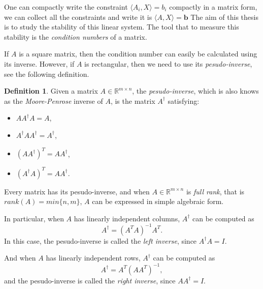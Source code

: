 \documentclass[12pt]{amsart}
\numberwithin{equation}{section}
\theoremstyle{definition}
\newtheorem{definition}[thm]{Definition}
\numberwithin{thm}{section}
\begin{document}

\smallskip

One can compactly write the constraint $\langle A_i, X \rangle = b_i$ compactly in a matrix form, we can collect all the constraints and write it is $ \langle A, X \rangle = \mathbf{b}$ 
The aim of this thesis is to study the stability of this linear system. 
The tool that to measure this stability is the \emph{condition numbers} of a matrix.

If $A$ is a square matrix, then the condition number can easily be calculated using its inverse. 
However, if $A$ is rectangular, then we need to use its \emph{pesudo-inverse}, see the following definition.

\begin{definition}
     Given a matrix $A \in \mathbb{R}^{m \times n}$, the \emph{pesudo-inverse},
     which is also knows as the \emph{Moore-Penrose} inverse of $A$, is the matrix
     $A^\dagger$ satisfying:
     \begin{itemize}
          \item $A A^\dagger A = A$,
          \item $A^\dagger A A^\dagger = A^\dagger$,
          \item $(A A^\dagger)^T = A A^\dagger$,
          \item $(A^\dagger A)^T = A A^\dagger$.
        \end{itemize}
\end{definition}

Every matrix has its pesudo-inverse, and when $A \in \mathbb{R}^{m \times n}$ is \emph{full rank}, 
that is $rank(A) = min\{n, m\}$, $A$ can be expressed in simple algebraic form.

In particular, when $A$ has linearly independent columns, $A^\dagger$ can be computed as
\begin{equation*}
     A^\dagger = (A^T A)^{-1} A^T.
\end{equation*}
In this case, the pesudo-inverse is called the \emph{left inverse}, since $A^\dagger A = I$.

\smallskip
And when $A$ has linearly independent rows, $A^\dagger$ can be computed as
\begin{equation*}
     A^\dagger = A^T (A A^T)^{-1},
\end{equation*}
and the pesudo-inverse is called the \emph{right inverse}, since $A A^\dagger = I$. 
\end{document}

